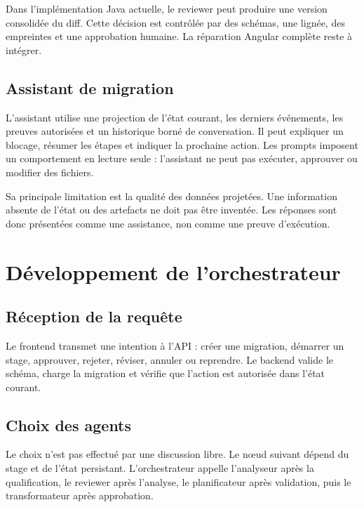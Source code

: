 Dans l'implémentation Java actuelle, le reviewer peut produire une version consolidée du diff. Cette décision est contrôlée par des schémas, une lignée, des empreintes et une approbation humaine. La réparation Angular complète reste à intégrer.

\subsection{Assistant de migration}

L'assistant utilise une projection de l'état courant, les derniers événements, les preuves autorisées et un historique borné de conversation. Il peut expliquer un blocage, résumer les étapes et indiquer la prochaine action. Les prompts imposent un comportement en lecture seule : l'assistant ne peut pas exécuter, approuver ou modifier des fichiers.

Sa principale limitation est la qualité des données projetées. Une information absente de l'état ou des artefacts ne doit pas être inventée. Les réponses sont donc présentées comme une assistance, non comme une preuve d'exécution.

\section{Développement de l'orchestrateur}

\subsection{Réception de la requête}

Le frontend transmet une intention à l'API : créer une migration, démarrer un stage, approuver, rejeter, réviser, annuler ou reprendre. Le backend valide le schéma, charge la migration et vérifie que l'action est autorisée dans l'état courant.

\subsection{Choix des agents}

Le choix n'est pas effectué par une discussion libre. Le nœud suivant dépend du stage et de l'état persistant. L'orchestrateur appelle l'analyseur après la qualification, le reviewer après l'analyse, le planificateur après validation, puis le transformateur après approbation.

